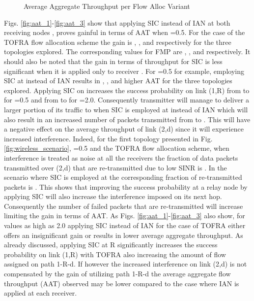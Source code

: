 \documentclass[conference]{IEEEtran}
\begin{document}
\begin{figure}[t]
\centering
{}
\label{fig:flow_alloc_thrput}
\caption{Average Aggregate Throughput per Flow Alloc Variant}
\end{figure}

Figs. \ref{fig:aat_1}-\ref{fig:aat_3} show that applying SIC instead of IAN
at both receiving nodes ,  proves gainful in terms of AAT when =0.5. For the case of the TOFRA flow allocation scheme the gain is
, , and  respectively for the three topologies explored. The corresponding values for FMP are , ,
and  respectively. It should also be noted that the gain in terms of throughput for SIC is less significant when it is applied only
to receiver . For =0.5 for example, employing SIC at  instead of IAN results in , , and  higher AAT for the three topologies explored.
Applying SIC on  increases the success probability on link (1,R) from  to  for =0.5 and from  to  for =2.0.
Consequently transmitter  will manage to deliver a larger portion of its traffic to  when SIC is employed at  instead of IAN which will also
result in an increased number of packets transmitted from  to . This will have a negative effect on the average throughput of link (2,d) since
it will experience increased interference. Indeed, for the first topology presented in Fig. \ref{fig:wireless_scenario}, =0.5 and the TOFRA flow
allocation scheme, when interference is treated as noise at all the receivers the fraction of data packets transmitted over (2,d)
that are re-transmitted due to low SINR
is . In the scenario where SIC is employed at  the corresponding fraction of re-transmitted packets is .
This shows that improving the success probability at a relay node by applying SIC will also increase the interference imposed on its next hop.
Consequently the number of failed packets that are re-transmitted will increase limiting the gain in terms of AAT.
As Figs. \ref{fig:aat_1}-\ref{fig:aat_3} also show, for  values as high as 2.0 applying SIC instead of IAN for the case of TOFRA
either offers an insignificant gain or results in lower average aggregate throughput. As already discussed, applying SIC at R significantly
increases the success probability on link (1,R) with TOFRA also increasing the amount of flow assigned on path 1-R-d.
If however the increased interference on link (2,d) is not compensated by the gain of utilizing path 1-R-d the average aggregate flow throughput (AAT)
observed may be lower compared to the case where IAN is applied at each receiver.
\end{document}
